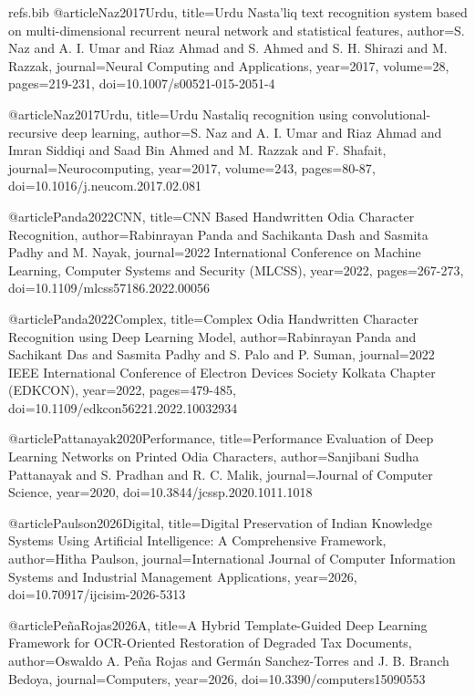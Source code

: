 \begin{filecontents}{refs.bib}
    @article{Naz2017Urdu,
    title={Urdu Nasta’liq text recognition system based on multi-dimensional recurrent neural network and statistical features},
    author={S. Naz and A. I. Umar and Riaz Ahmad and S. Ahmed and S. H. Shirazi and M. Razzak},
    journal={Neural Computing and Applications},
    year={2017},
    volume={28},
    pages={219-231},
    doi={10.1007/s00521-015-2051-4}
    }
    
    @article{Naz2017Urdu,
    title={Urdu Nastaliq recognition using convolutional-recursive deep learning},
    author={S. Naz and A. I. Umar and Riaz Ahmad and Imran Siddiqi and Saad Bin Ahmed and M. Razzak and F. Shafait},
    journal={Neurocomputing},
    year={2017},
    volume={243},
    pages={80-87},
    doi={10.1016/j.neucom.2017.02.081}
    }
    
    @article{Panda2022CNN,
    title={CNN Based Handwritten Odia Character Recognition},
    author={Rabinrayan Panda and Sachikanta Dash and Sasmita Padhy and M. Nayak},
    journal={2022 International Conference on Machine Learning, Computer Systems and Security (MLCSS)},
    year={2022},
    pages={267-273},
    doi={10.1109/mlcss57186.2022.00056}
    }
    
    @article{Panda2022Complex,
    title={Complex Odia Handwritten Character Recognition using Deep Learning Model},
    author={Rabinrayan Panda and Sachikant Das and Sasmita Padhy and S. Palo and P. Suman},
    journal={2022 IEEE International Conference of Electron Devices Society Kolkata Chapter (EDKCON)},
    year={2022},
    pages={479-485},
    doi={10.1109/edkcon56221.2022.10032934}
    }
    
    @article{Pattanayak2020Performance,
    title={Performance Evaluation of Deep Learning Networks on Printed Odia Characters},
    author={Sanjibani Sudha Pattanayak and S. Pradhan and R. C. Malik},
    journal={Journal of Computer Science},
    year={2020},
    doi={10.3844/jcssp.2020.1011.1018}
    }
    
    @article{Paulson2026Digital,
    title={Digital Preservation of Indian Knowledge Systems Using Artificial Intelligence: A Comprehensive Framework},
    author={Hitha Paulson},
    journal={International Journal of Computer Information Systems and Industrial Management Applications},
    year={2026},
    doi={10.70917/ijcisim-2026-5313}
    }
    
    @article{PeñaRojas2026A,
    title={A Hybrid Template-Guided Deep Learning Framework for OCR-Oriented Restoration of Degraded Tax Documents},
    author={Oswaldo A. Peña Rojas and Germán Sanchez-Torres and J. B. Branch Bedoya},
    journal={Computers},
    year={2026},
    doi={10.3390/computers15090553}
    }
    

\end{filecontents}
